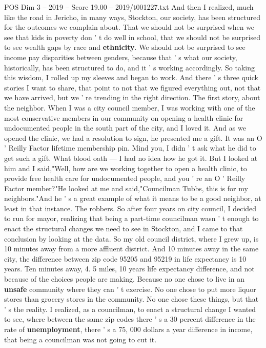 \begin{textsample}{POS Dim 3 – 2019 – Score 19.00 – 2019/t001227.txt}
And then I realized, much like the road in Jericho, in many ways, Stockton, our society, has been structured for the outcomes we complain about.
That we should not be surprised when we see that kids in poverty don ' t do well in school, that we should not be surprised to see wealth gaps by race and \textbf{ethnicity}.
We should not be surprised to see income pay disparities between genders, because that ' s what our society, historically, has been structured to do, and it ' s working accordingly.
So taking this wisdom, I rolled up my sleeves and began to work.
And there ' s three quick stories I want to share, that point to not that we figured everything out, not that we have arrived, but we ' re trending in the right direction.
The first story, about the neighbor.
When I was a city council member, I was working with one of the most conservative members in our community on opening a health clinic for undocumented people in the south part of the city, and I loved it.
And as we opened the clinic, we had a resolution to sign, he presented me a gift.
It was an O ' Reilly Factor lifetime membership pin.
Mind you, I didn ' t ask what he did to get such a gift.
What blood oath — I had no idea how he got it.
But I looked at him and I said,"Well, how are we working together to open a health clinic, to provide free health care for undocumented people, and you ' re an O ' Reilly Factor member?"He looked at me and said,"Councilman Tubbs, this is for my neighbors."And he ' s a great example of what it means to be a good neighbor, at least in that instance.
The robbers.
So after four years on city council, I decided to run for mayor, realizing that being a part-time councilman wasn ' t enough to enact the structural changes we need to see in Stockton, and I came to that conclusion by looking at the data.
So my old council district, where I grew up, is 10 minutes away from a more affluent district.
And 10 minutes away in the same city, the difference between zip code 95205 and 95219 in life expectancy is 10 years.
Ten minutes away, 4. 5 miles, 10 years life expectancy difference, and not because of the choices people are making.
Because no one chose to live in an \textbf{unsafe} community where they can ' t exercise.
No one chose to put more liquor stores than grocery stores in the community.
No one chose these things, but that ' s the reality.
I realized, as a councilman, to enact a structural change I wanted to see, where between the same zip codes there ' s a 30 percent difference in the rate of \textbf{unemployment}, there ' s a 75, 000 dollars a year difference in income, that being a councilman was not going to cut it.

\end{textsample}
